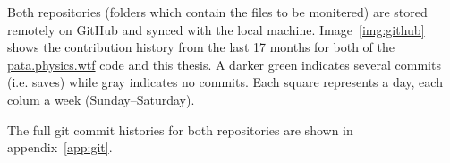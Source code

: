 Both repositories (folders which contain the files to be monitered) are stored remotely on GitHub \autocite{GitHub2016} and synced with the local machine. Image~\ref{img:github} shows the contribution history from the last 17 months for both of the \url{pata.physics.wtf} code and this thesis. A darker green indicates several commits (i.e. saves) while gray indicates no commits. Each square represents a day, each colum a week (Sunday--Saturday).

The full git commit histories for both repositories are shown in appendix~\ref{app:git}. 


\stopcontents[chapters]
